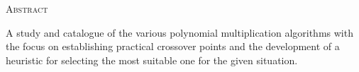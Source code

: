 \begin{center}
  \textsc{Abstract}
\end{center}
%
\noindent
%
A study and catalogue of the various polynomial multiplication algorithms with the focus on establishing practical crossover points and the development of a heuristic for selecting the most suitable one for the given situation.

